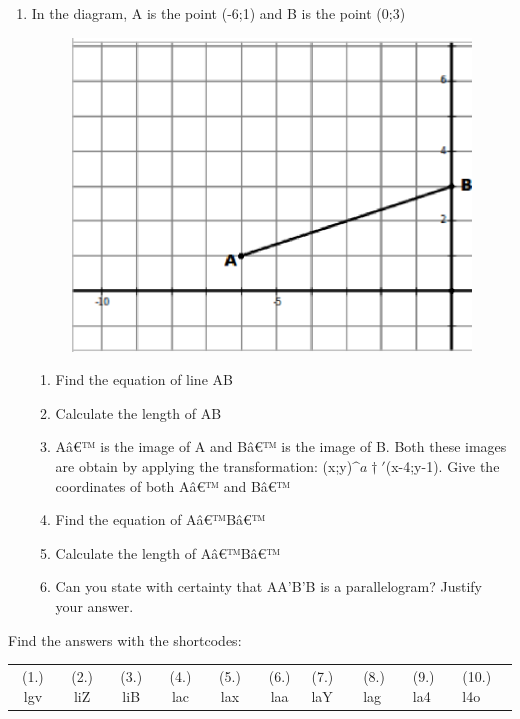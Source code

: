 \begin{enumerate}[noitemsep, label=\textbf{\arabic*}. ]
\item In the diagram, A is the point (-6;1) and B is the point (0;3)
    \setcounter{subfigure}{0}
	\begin{figure}[H] %
    \begin{center}
    \label{m39167*id740344!!!underscore!!!media}\label{m39167*id740344!!!underscore!!!printimage}\includegraphics[width=0.4\columnwidth]{col11306.imgs/m39167_MG10C14_5.png} %
      \vspace{2pt}
    \vspace{.1in}
    \end{center}
 \end{figure}       \label{m39167*id982373}\begin{enumerate}[noitemsep, label=\textbf{\alph*}. ] 
            \item Find the equation of line AB \item Calculate the length of AB\item  A\^{a}€™ is the image of A and B\^{a}€™ is the image of B. Both these images are obtain by applying the transformation: (x;y)\begin{math}\^{a}†'\end{math}(x-4;y-1). Give the coordinates of both A\^{a}€™ and B\^{a}€™\item Find the equation of A\^{a}€™B\^{a}€™\item Calculate the length of A\^{a}€™B\^{a}€™\item Can you state with certainty that AA'B'B is a parallelogram? Justify your answer.\end{enumerate}
                 \end{enumerate}
\label{m39167**end}
  \label{71522cd1c95e0cbedb9f300409036b1b**end}
\par {} Find the answers with the shortcodes:
 \par \begin{tabular}[h]{cccccc}
 (1.) lgv  &  (2.) liZ  &  (3.) liB  &  (4.) lac  &  (5.) lax  &  (6.) laa  &  (7.) laY  &  (8.) lag  &  (9.) la4  &  (10.) l4o  & \end{tabular}
